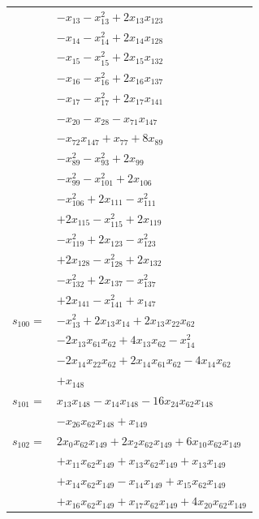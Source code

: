 \begin{longtable}{@{}r@{\;}l@{}}
 & \(\displaystyle -x_{13} -x_{13}^{2} +2x_{13}x_{123}\) \\
 & \(\displaystyle -x_{14} -x_{14}^{2} +2x_{14}x_{128}\) \\
 & \(\displaystyle -x_{15} -x_{15}^{2} +2x_{15}x_{132}\) \\
 & \(\displaystyle -x_{16} -x_{16}^{2} +2x_{16}x_{137}\) \\
 & \(\displaystyle -x_{17} -x_{17}^{2} +2x_{17}x_{141}\) \\
 & \(\displaystyle -x_{20} -x_{28} -x_{71}x_{147}\) \\
 & \(\displaystyle -x_{72}x_{147} +x_{77} +8x_{89}\) \\
 & \(\displaystyle -x_{89}^{2} -x_{93}^{2} +2x_{99}\) \\
 & \(\displaystyle -x_{99}^{2} -x_{101}^{2} +2x_{106}\) \\
 & \(\displaystyle -x_{106}^{2} +2x_{111} -x_{111}^{2}\) \\
 & \(\displaystyle +2x_{115} -x_{115}^{2} +2x_{119}\) \\
 & \(\displaystyle -x_{119}^{2} +2x_{123} -x_{123}^{2}\) \\
 & \(\displaystyle +2x_{128} -x_{128}^{2} +2x_{132}\) \\
 & \(\displaystyle -x_{132}^{2} +2x_{137} -x_{137}^{2}\) \\
 & \(\displaystyle +2x_{141} -x_{141}^{2} +x_{147}\) \\[3pt]
\(s_{100}=\) & \(\displaystyle -x_{13}^{2} +2x_{13}x_{14} +2x_{13}x_{22}x_{62}\) \\
 & \(\displaystyle -2x_{13}x_{61}x_{62} +4x_{13}x_{62} -x_{14}^{2}\) \\
 & \(\displaystyle -2x_{14}x_{22}x_{62} +2x_{14}x_{61}x_{62} -4x_{14}x_{62}\) \\
 & \(\displaystyle +x_{148}\) \\[3pt]
\(s_{101}=\) & \(\displaystyle x_{13}x_{148} -x_{14}x_{148} -16x_{24}x_{62}x_{148}\) \\
 & \(\displaystyle -x_{26}x_{62}x_{148} +x_{149}\) \\[3pt]
\(s_{102}=\) & \(\displaystyle 2x_{0}x_{62}x_{149} +2x_{2}x_{62}x_{149} +6x_{10}x_{62}x_{149}\) \\
 & \(\displaystyle +x_{11}x_{62}x_{149} +x_{13}x_{62}x_{149} +x_{13}x_{149}\) \\
 & \(\displaystyle +x_{14}x_{62}x_{149} -x_{14}x_{149} +x_{15}x_{62}x_{149}\) \\
 & \(\displaystyle +x_{16}x_{62}x_{149} +x_{17}x_{62}x_{149} +4x_{20}x_{62}x_{149}\) \\

\end{longtable}
